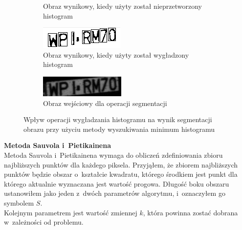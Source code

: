 \begin{figure}
\begin{subfigure}[b]{0.45\textwidth}
    \caption{Obraz wynikowy, kiedy użyty został nieprzetworzony histogram}
    \label{fig:research_min_histogram_bad_output}
  \end{subfigure}
  \begin{subfigure}[b]{0.45\textwidth}
    \includegraphics[width=\textwidth]{img/research-min-histogram-good-output}
    \caption{Obraz wynikowy, kiedy użyty został wygładzony histogram}
    \label{fig:research_min_histogram_good_output}
  \end{subfigure}
 \begin{subfigure}[b]{0.45\textwidth}
    \includegraphics[width=\textwidth]{img/research-min-histogram-input}
    \caption{Obraz wejściowy dla operacji segmentacji}
    \label{fig:research_min_histogram_input}
  \end{subfigure}
  \caption{Wpływ operacji wygładzania histogramu na wynik segmentacji obrazu przy użyciu metody wyszukiwania minimum histogramu}
  \label{fig:research_min_histogram}
\end{figure}

\textbf{Metoda Sauvola i~Pietikainena} \\
Metoda Sauvola i~Pietikainena wymaga do obliczeń zdefiniowania zbioru najbliższych punktów dla każdego piksela. Przyjąłem, że zbiorem najbliższych punktów będzie obszar o~kształcie kwadratu, którego środkiem jest punkt dla którego aktualnie wyznaczana jest wartość progowa. Długość boku obszaru ustanowiłem jako jeden z~dwóch parametrów algorytmu, i~oznaczyłem go symbolem $S$. \\
Kolejnym parametrem jest wartość zmiennej $k$, która powinna zostać dobrana w~zależności od problemu.\\

